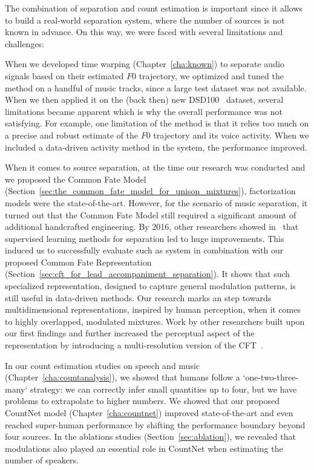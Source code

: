 The combination of separation and count estimation is important since it allows to build a real-world separation system, where the number of sources is not known in advance.
On this way, we were faced with several limitations and challenges:
\par
When we developed time warping (Chapter~\ref{cha:known}) to separate audio signals based on their estimated \(F0\) trajectory, we optimized and tuned the method on a handful of music tracks, since a large test dataset was not available. When we then applied it on the (back then) new DSD100~\cite{liutkus17} dataset, several limitations became apparent which is why the overall performance was not satisfying. For example, one limitation of the method is that it relies too much on a precise and robust estimate of the \(F0\) trajectory and its voice activity. When we included a data-driven activity method in the system, the performance improved.
\par
When it comes to source separation, at the time our research was conducted and we proposed the Common Fate Model (Section~\ref{sec:the_common_fate_model_for_unison_mixtures}), factorization models were the state-of-the-art.
However, for the scenario of music separation, it turned out that the Common Fate Model still required a significant amount of additional handcrafted engineering.
By 2016, other researchers showed in~\cite{uhlich15, nugraha162} that supervised learning methods for separation led to huge improvements. This induced us to successfully evaluate such as system in combination with our proposed Common Fate Representation (Section~\ref{sec:cft_for_lead_accompaniment_separation}).
It shows that such specialized representation, designed to capture general modulation patterns, is still useful in data-driven methods.
Our research marks an step towards multidimensional representations, inspired by human perception, when it comes to highly overlapped, modulated mixtures. Work by other researchers built upon our first findings and further increased the perceptual aspect of the representation by introducing a multi-resolution version of the CFT~\cite{seetharaman17, pishdadian18}.
\par
In our count estimation studies on speech and music (Chapter~\ref{cha:countanalysis}), we showed that humans follow a `one-two-three-many` strategy: we can correctly infer small quantities up to four, but we have problems to extrapolate to higher numbers.
We showed that our proposed CountNet model (Chapter~\ref{cha:countnet}) improved state-of-the-art and even reached super-human performance by shifting the performance boundary beyond four sources. In the ablations studies (Section~\ref{sec:ablation}), we revealed that modulations also played an essential role in CountNet when estimating the number of speakers.
